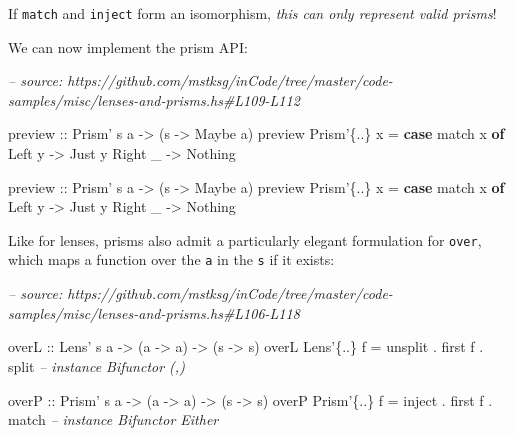 \documentclass[]{article}
\newenvironment{Shaded}{}{}
\newcommand{\CommentTok}[1]{\textcolor[rgb]{0.38,0.63,0.69}{\textit{#1}}}
\newcommand{\DataTypeTok}[1]{\textcolor[rgb]{0.56,0.13,0.00}{#1}}
\newcommand{\FunctionTok}[1]{\textcolor[rgb]{0.02,0.16,0.49}{#1}}
\newcommand{\KeywordTok}[1]{\textcolor[rgb]{0.00,0.44,0.13}{\textbf{#1}}}
\newcommand{\NormalTok}[1]{#1}
\newcommand{\OtherTok}[1]{\textcolor[rgb]{0.00,0.44,0.13}{#1}}
\begin{document}
If \texttt{match} and \texttt{inject} form an isomorphism, \emph{this can only
represent valid prisms}!

We can now implement the prism API:

\begin{Shaded}
\begin{Highlighting}[]
\CommentTok{-- source: https://github.com/mstksg/inCode/tree/master/code-samples/misc/lenses-and-prisms.hs#L109-L112}

\OtherTok{preview ::} \DataTypeTok{Prism'}\NormalTok{ s a }\OtherTok{->}\NormalTok{ (s }\OtherTok{->} \DataTypeTok{Maybe}\NormalTok{ a)}
\NormalTok{preview }\DataTypeTok{Prism'}\NormalTok{\{}\FunctionTok{..}\NormalTok{\} x }\FunctionTok{=} \KeywordTok{case}\NormalTok{ match x }\KeywordTok{of}
    \DataTypeTok{Left}\NormalTok{  y }\OtherTok{->} \DataTypeTok{Just}\NormalTok{ y}
    \DataTypeTok{Right}\NormalTok{ _ }\OtherTok{->} \DataTypeTok{Nothing}

\OtherTok{preview ::} \DataTypeTok{Prism'}\NormalTok{ s a }\OtherTok{->}\NormalTok{ (s }\OtherTok{->} \DataTypeTok{Maybe}\NormalTok{ a)}
\NormalTok{preview }\DataTypeTok{Prism'}\NormalTok{\{}\FunctionTok{..}\NormalTok{\} x }\FunctionTok{=} \KeywordTok{case}\NormalTok{ match x }\KeywordTok{of}
    \DataTypeTok{Left}\NormalTok{  y }\OtherTok{->} \DataTypeTok{Just}\NormalTok{ y}
    \DataTypeTok{Right}\NormalTok{ _ }\OtherTok{->} \DataTypeTok{Nothing}
\end{Highlighting}
\end{Shaded}

Like for lenses, prisms also admit a particularly elegant formulation for
\texttt{over}, which maps a function over the \texttt{a} in the \texttt{s} if it
exists:

\begin{Shaded}
\begin{Highlighting}[]
\CommentTok{-- source: https://github.com/mstksg/inCode/tree/master/code-samples/misc/lenses-and-prisms.hs#L106-L118}

\OtherTok{overL ::} \DataTypeTok{Lens'}\NormalTok{ s a }\OtherTok{->}\NormalTok{ (a }\OtherTok{->}\NormalTok{ a) }\OtherTok{->}\NormalTok{ (s }\OtherTok{->}\NormalTok{ s)}
\NormalTok{overL }\DataTypeTok{Lens'}\NormalTok{\{}\FunctionTok{..}\NormalTok{\}  f }\FunctionTok{=}\NormalTok{ unsplit }\FunctionTok{.}\NormalTok{ first f }\FunctionTok{.}\NormalTok{ split   }\CommentTok{-- instance Bifunctor (,)}

\OtherTok{overP ::} \DataTypeTok{Prism'}\NormalTok{ s a }\OtherTok{->}\NormalTok{ (a }\OtherTok{->}\NormalTok{ a) }\OtherTok{->}\NormalTok{ (s }\OtherTok{->}\NormalTok{ s)}
\NormalTok{overP }\DataTypeTok{Prism'}\NormalTok{\{}\FunctionTok{..}\NormalTok{\} f }\FunctionTok{=}\NormalTok{ inject }\FunctionTok{.}\NormalTok{ first f }\FunctionTok{.}\NormalTok{ match    }\CommentTok{-- instance Bifunctor Either}
\end{Highlighting}
\end{Shaded}
\end{document}
